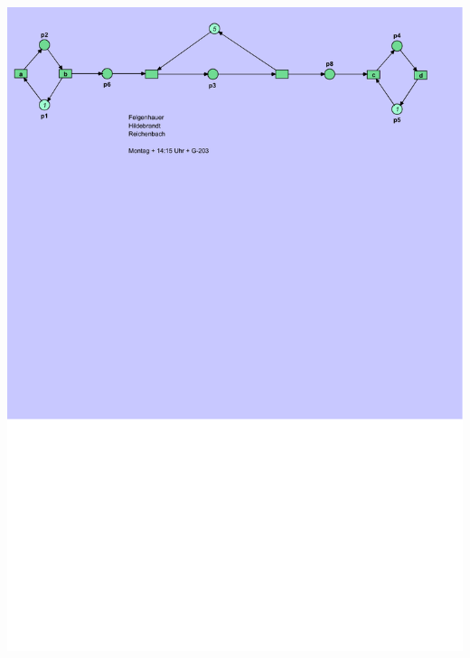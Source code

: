 \documentclass[12pt,a4paper]{../krautsourcing/homework}
\begin{document}
\includegraphics[scale=0.8,trim={0mm 225mm 10mm 0cm},clip]{Aufgabe_6-4/Aufgabe_6-4-7-sim-1.pdf}

\newpage
\end{document}
